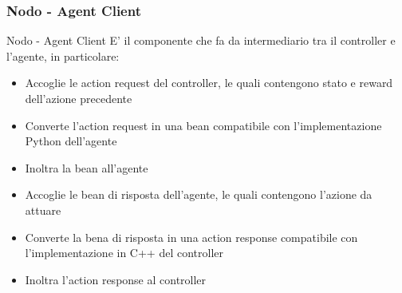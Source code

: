 \documentclass[compress]{beamer}
\begin{document}
\subsubsection*{Nodo - Agent Client}
\begin{frame}{Nodo - Agent Client}
    E' il componente che fa da intermediario tra il controller e l'agente, in particolare:
    \begin{itemize}
        \item Accoglie le action request del controller, le quali contengono stato e reward dell'azione precedente 
        \item Converte l'action request in una bean compatibile con l'implementazione Python dell'agente
        \item Inoltra la bean all'agente
        \item Accoglie le bean di risposta dell'agente, le quali contengono l'azione da attuare
        \item Converte la bena di risposta in una action response compatibile con l'implementazione in C++ del controller
        \item Inoltra l'action response al controller
    \end{itemize}
\end{frame}
\end{document}
